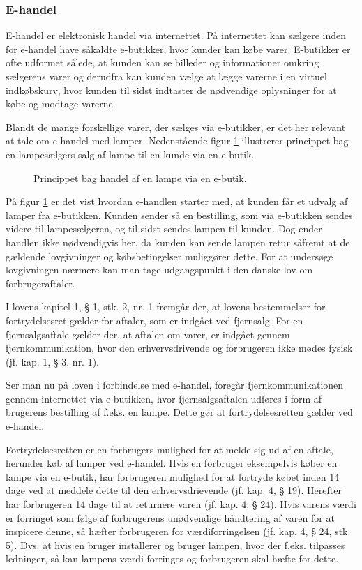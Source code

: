 \subsubsection{E-handel}
\label{sec:ehandel}
E-handel er elektronisk handel via internettet\cite{ddo_ehandel}. På internettet kan sælgere inden for e-handel have såkaldte e-butikker, hvor kunder kan købe varer\cite{ddo_ebutik}. E-butikker er ofte udformet sålede, at kunden kan se billeder og informationer omkring sælgerens varer og derudfra kan kunden vælge at lægge varerne i en virtuel indkøbskurv, hvor kunden til sidst indtaster de nødvendige oplysninger for at købe og modtage varerne.

Blandt de mange forskellige varer, der sælges via e-butikker, er det her relevant at tale om e-handel med lamper. Nedenstående figur \ref{fig:e_handel_med_lamper} illustrerer princippet bag en lampesælgers salg af lampe til en kunde via en e-butik.
\begin{figure}[H]
	\centering
	\def\svgwidth{\columnwidth}
	
	\caption{Princippet bag handel af en lampe via en e-butik.}
    \label{fig:e_handel_med_lamper}
\end{figure}

På figur \ref{fig:e_handel_med_lamper} er det vist hvordan e-handlen starter med, at kunden får et udvalg af lamper fra e-butikken. Kunden sender så en bestilling, som via e-butikken sendes videre til lampesælgeren, og til sidst sendes lampen til kunden. Dog ender handlen ikke nødvendigvis her, da kunden kan sende lampen retur såfremt at de gældende lovgivninger og købsbetingelser muliggører dette. For at undersøge lovgivningen nærmere kan man tage udgangspunkt i den danske lov om forbrugeraftaler\cite{retsinformationen}.

I lovens kapitel 1, § 1, stk. 2, nr. 1 fremgår der, at lovens bestemmelser for fortrydelsesret gælder for aftaler, som er indgået ved fjernsalg. For en  fjernsalgsaftale gælder der, at aftalen om varer, er indgået gennem fjernkommunikation, hvor den erhvervsdrivende og forbrugeren ikke mødes fysisk (jf. kap. 1, § 3, nr. 1).

Ser man nu på loven i forbindelse med e-handel, foregår fjernkommunikationen gennem internettet via e-butikken, hvor fjernsalgsaftalen udføres i form af brugerens bestilling af f.eks. en lampe. Dette gør at fortrydelsesretten gælder ved e-handel.

Fortrydelsesretten er en forbrugers mulighed for at melde sig ud af en aftale, herunder køb af lamper ved e-handel. Hvis en forbruger eksempelvis køber en lampe via en e-butik, har forbrugeren mulighed for at fortryde købet inden 14 dage ved at meddele dette til den erhvervsdrievende (jf. kap. 4, § 19). Herefter har forbrugeren 14 dage til at returnere varen (jf. kap. 4, § 24). Hvis varens værdi er forringet som følge af forbrugerens unødvendige håndtering af varen for at inspicere denne, så hæfter forbrugeren for værdiforringelsen (jf. kap. 4, § 24, stk. 5). Dvs. at hvis en bruger installerer og bruger lampen, hvor der f.eks. tilpasses ledninger, så kan lampens værdi forringes og forbrugeren skal hæfte for dette. 

